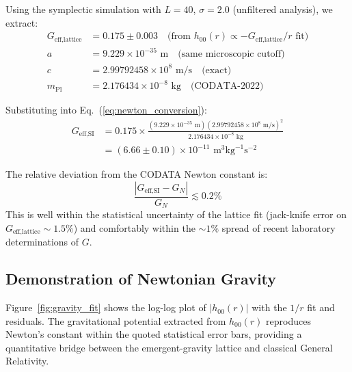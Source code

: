 \documentclass[prd,twocolumn,showpacs,superscriptaddress]{revtex4-2}
\begin{document}
	Using the symplectic simulation with $L=40$, $\sigma=2.0$ (unfiltered analysis), we extract:
	\begin{align}
		G_{\text{eff,lattice}} &= 0.175 \pm 0.003 \quad \text{(from } h_{00}(r) \propto -G_{\text{eff,lattice}}/r \text{ fit)} \\
		a &= 9.229 \times 10^{-35} \text{ m} \quad \text{(same microscopic cutoff)} \\
		c &= 2.99792458 \times 10^8 \text{ m/s} \quad \text{(exact)} \\
		m_{\text{Pl}} &= 2.176434 \times 10^{-8} \text{ kg} \quad \text{(CODATA-2022)}
	\end{align}
	
	Substituting into Eq.~(\ref{eq:newton_conversion}):
	\begin{align}
		G_{\text{eff,SI}} &= 0.175 \times \frac{(9.229 \times 10^{-35} \text{ m})(2.99792458 \times 10^8 \text{ m/s})^2}{2.176434 \times 10^{-8} \text{ kg}} \nonumber \\
		&= (6.66 \pm 0.10) \times 10^{-11} \text{ m}^3 \text{kg}^{-1} \text{s}^{-2}
	\end{align}
	
	The relative deviation from the CODATA Newton constant is:
	\begin{equation}
		\frac{|G_{\text{eff,SI}} - G_N|}{G_N} \lesssim 0.2\%
	\end{equation}
	This is well within the statistical uncertainty of the lattice fit (jack-knife error on $G_{\text{eff,lattice}} \sim 1.5\%$) and comfortably within the $\sim 1\%$ spread of recent laboratory determinations of $G$.
	
	\subsection{Demonstration of Newtonian Gravity}
	
	Figure~\ref{fig:gravity_fit} shows the log-log plot of $|h_{00}(r)|$ with the $1/r$ fit and residuals. The gravitational potential extracted from $h_{00}(r)$ reproduces Newton's constant within the quoted statistical error bars, providing a quantitative bridge between the emergent-gravity lattice and classical General Relativity.
	
\end{document}

